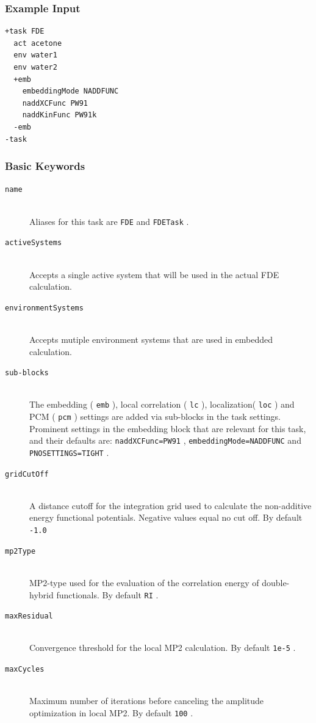 \documentclass[bibliography=totocnumbered,a4paper,10pt,oneside]{scrbook}
\newcommand{\ttt}[1]{%
  \begingroup\setlength{\fboxsep}{1pt}%
  \colorbox{serenity-green!30}{\texttt{\hspace*{2pt}\vphantom{(g}#1\hspace*{2pt}}}%
  \endgroup
}
\begin{document}
\subsubsection{Example Input}
\begin{lstlisting}
+task FDE
  act acetone
  env water1
  env water2
  +emb
    embeddingMode NADDFUNC
    naddXCFunc PW91
    naddKinFunc PW91k
  -emb
-task
\end{lstlisting}
\subsubsection{Basic Keywords}
\begin{description}
	 \item [\texttt{name}]\hfill \\
	Aliases for this task are \ttt{FDE} and \ttt{FDETask}.
	\item [\texttt{activeSystems}]\hfill \\
	Accepts a single active system that will be used in the actual FDE calculation.
	\item [\texttt{environmentSystems}]\hfill \\
	Accepts mutiple environment systems that are used in embedded calculation.
	\item [\texttt{sub-blocks}]\hfill \\
	The embedding (\ttt{emb}), local correlation (\ttt{lc}), localization(\ttt{loc}) and PCM (\ttt{pcm}) settings are added via sub-blocks in the task settings.
	Prominent settings in the embedding block that are relevant for this task, and their defaults are:
	\ttt{naddXCFunc=PW91}, \ttt{embeddingMode=NADDFUNC} and \ttt{PNOSETTINGS=TIGHT}.
	\item [\texttt{gridCutOff}] \hfill \\
    A distance cutoff for the integration grid used to calculate the non-additive  energy functional potentials. Negative values equal no cut off. By default \ttt{-1.0}
	\item [\texttt{mp2Type}] \hfill \\
	MP2-type used for the evaluation of the correlation energy of double-hybrid functionals. By default \ttt{RI}.
	\item [\texttt{maxResidual}] \hfill \\
	Convergence threshold for the local MP2 calculation. By default \ttt{1e-5}.
	\item [\texttt{maxCycles}] \hfill \\
	Maximum number of iterations before canceling the amplitude optimization in local MP2. By default \ttt{100}.

\end{description}
\end{document}
